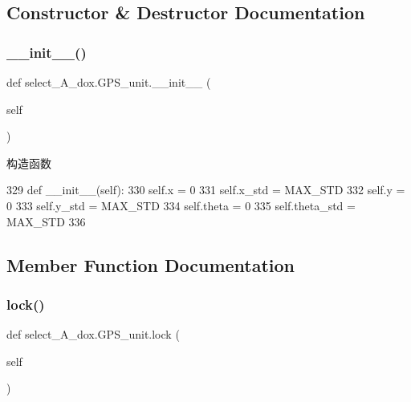 \subsection{Constructor \& Destructor Documentation}
\mbox{\label{classselect___a__dox_1_1_g_p_s__unit_a0199c8696c6358bb2aab2ae49f1c29d2}} 
\subsubsection{\texorpdfstring{\+\_\+\+\_\+init\+\_\+\+\_\+()}{\_\_init\_\_()}}
{\footnotesize\ttfamily def select\+\_\+\+A\+\_\+dox.\+G\+P\+S\+\_\+unit.\+\_\+\+\_\+init\+\_\+\+\_\+ (\begin{DoxyParamCaption}\item[{}]{self }\end{DoxyParamCaption})}



构造函数 


\begin{DoxyCode}
329     \textcolor{keyword}{def }\_\_init\_\_(self):
330         self.x = 0
331         self.x\_std = MAX\_STD
332         self.y = 0
333         self.y\_std = MAX\_STD
334         self.theta = 0
335         self.theta\_std = MAX\_STD
336 
\end{DoxyCode}


\subsection{Member Function Documentation}
\mbox{\label{classselect___a__dox_1_1_g_p_s__unit_a5a2546b2fa4222e555b51a5c2e23c046}} 
\subsubsection{\texorpdfstring{lock()}{lock()}}
{\footnotesize\ttfamily def select\+\_\+\+A\+\_\+dox.\+G\+P\+S\+\_\+unit.\+lock (\begin{DoxyParamCaption}\item[{}]{self }\end{DoxyParamCaption})}



